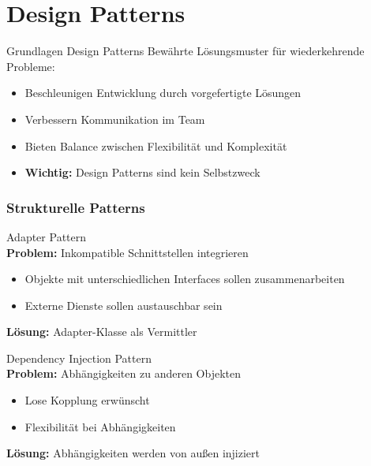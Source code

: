 \section{Design Patterns}

\begin{concept}{Grundlagen Design Patterns}
Bewährte Lösungsmuster für wiederkehrende Probleme:
\begin{itemize}
    \item Beschleunigen Entwicklung durch vorgefertigte Lösungen
    \item Verbessern Kommunikation im Team
    \item Bieten Balance zwischen Flexibilität und Komplexität
    \item \textbf{Wichtig:} Design Patterns sind kein Selbstzweck
\end{itemize}
\end{concept}

\subsubsection{Strukturelle Patterns}

\begin{definition}{Adapter Pattern}\\
\textbf{Problem:} Inkompatible Schnittstellen integrieren
\begin{itemize}
    \item Objekte mit unterschiedlichen Interfaces sollen zusammenarbeiten
    \item Externe Dienste sollen austauschbar sein
\end{itemize}
\textbf{Lösung:} Adapter-Klasse als Vermittler
\end{definition}

\begin{definition}{Dependency Injection Pattern}\\
\textbf{Problem:} Abhängigkeiten zu anderen Objekten
\begin{itemize}
    \item Lose Kopplung erwünscht
    \item Flexibilität bei Abhängigkeiten
\end{itemize}
\textbf{Lösung:} Abhängigkeiten werden von außen injiziert
\end{definition}

